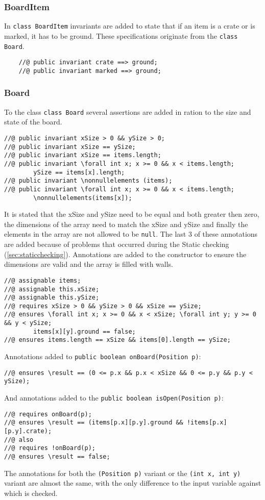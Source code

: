 \documentclass[a4paper]{article}
\begin{document}
	\subsubsection{BoardItem}
	In \texttt{class BoardItem} invariants are added to state that if an item is a crate or is marked, it has to be ground. These specifications originate from the \texttt{class Board}.
	\begin{lstlisting}
	//@ public invariant crate ==> ground;
	//@ public invariant marked ==> ground;
	\end{lstlisting}
	
	\subsubsection{Board}
	To the class \texttt{class Board} several assertions are added in ration to the size and state of the board.
	\begin{lstlisting}
//@ public invariant xSize > 0 && ySize > 0;
//@ public invariant xSize == ySize;
//@ public invariant xSize == items.length;
//@ public invariant \forall int x; x >= 0 && x < items.length; 
		ySize == items[x].length;
//@ public invariant \nonnullelements (items);
//@ public invariant \forall int x; x >= 0 && x < items.length; 
		\nonnullelements(items[x]);
	\end{lstlisting}
	It is stated that the xSize and ySize need to be equal and both greater then zero, the dimensions of the array need to match the xSize and ySize and finally the elements in the array are not allowed to be \texttt{null}. The last 3 of these annotations are added because of problems that occurred during the Static checking (\ref{sec:staticchecking}).
	Annotations are added to the constructor to ensure the dimensions are valid and the array is filled with walls.
	\begin{lstlisting}
//@ assignable items;
//@ assignable this.xSize;
//@ assignable this.ySize;
//@ requires xSize > 0 && ySize > 0 && xSize == ySize;
//@ ensures \forall int x; x >= 0 && x < xSize; \forall int y; y >= 0 && y < ySize; 
		items[x][y].ground == false;
//@ ensures items.length == xSize && items[0].length == ySize;
	\end{lstlisting}
	Annotations added to \texttt{public boolean onBoard(Position p)}:
	\begin{lstlisting}
//@ ensures \result == (0 <= p.x && p.x < xSize && 0 <= p.y && p.y < ySize);
	\end{lstlisting}
	And annotations added to the \texttt{public boolean isOpen(Position p)}:
	\begin{lstlisting}
//@ requires onBoard(p);
//@ ensures \result == (items[p.x][p.y].ground && !items[p.x][p.y].crate);
//@ also
//@ requires !onBoard(p);
//@ ensures \result == false;
	\end{lstlisting}
	The annotations for both the \texttt{(Position p)} variant or the \texttt{(int x, int y)} variant are almost the same, with the only difference to the input variable against which is checked.
	
\end{document}

